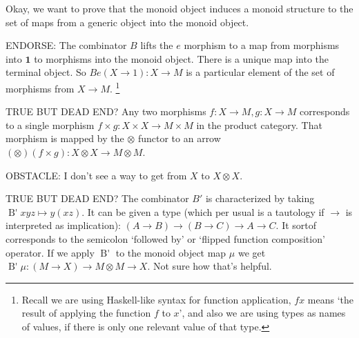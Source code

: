 \documentclass[a4paper]{article}
\begin{document}
\quad{}\quad


Okay, we want to prove that the monoid object induces a monoid structure to the set of maps from a generic object into the monoid object.

ENDORSE: The combinator \(B\) lifts the \(e\) morphism to a map from morphisms into \(\mathbf{1}\) to morphisms into the monoid object. There is a unique map into the terminal object. So \(B e (X \to 1) : X \to M\) is a particular element of the set of morphisms from \(X \to M\). \footnote{Recall we are using Haskell-like syntax for function application, \(f x\) means `the result of applying the function \(f\) to \(x\)', and also we are using types as names of values, if there is only one relevant value of that type.} 

TRUE BUT DEAD END? Any two morphisms \(f: X \to M, g: X \to M\) corresponds
to a single morphism \(f \times g: X \times X \to M \times M\) in the product category.
That morphism is mapped by the \(\otimes\) functor to an arrow \( (\otimes) (f \times g) : X \otimes X \to M \otimes M \).

OBSTACLE: I don't see a way to get from \(X\) to \(X \otimes X\).

TRUE BUT DEAD END? The combinator \(B'\) is characterized by taking \(\mathop{B'} x y z \mapsto y (x z)\).
It can be given a type (which per usual is a tautology if \(\to\) is interpreted as implication):
\((A \to B) \to (B \to C) \to A \to C\). It sortof corresponds to the semicolon `followed by' or `flipped function composition' operator. If we apply \(\mathop{B'}\) to the monoid object map \(\mu\) we get \(\mathop{B'} \mu : (M \to X) \to M \otimes M \to X\). Not sure how that's helpful.
\end{document}
